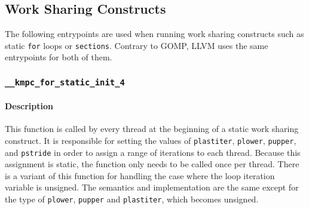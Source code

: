 \subsection{Work Sharing Constructs}

The following entrypoints are used when running work sharing constructs such as static \texttt{for}
loops or \texttt{sections}. Contrary to GOMP, LLVM uses the same entrypoints for both of them.

\subsubsection{\texttt{\_\_kmpc\_for\_static\_init\_4}}

\paragraph{Description} This function is called by every thread at the beginning of a static work
sharing construct. It is responsible for setting the values of \texttt{plastiter}, \texttt{plower},
\texttt{pupper}, and \texttt{pstride} in order to assign a range of iterations to each thread.
Because this assignment is static, the function only needs to be called once per thread. There is a
variant of this function for handling the case where the loop iteration variable is unsigned. The
semantics and implementation are the same except for the type of \texttt{plower}, \texttt{pupper}
and \texttt{plastiter}, which becomes unsigned.

